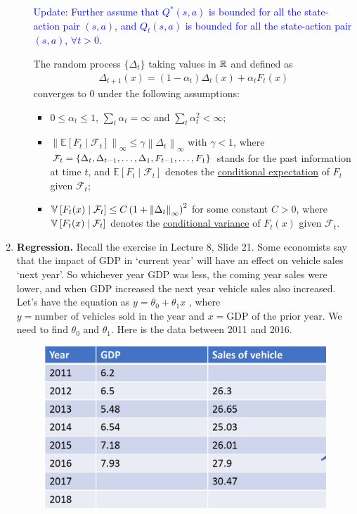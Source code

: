 \documentclass{article}
\newcommand{\mytextcolor}[1]{\textcolor{blue}{{}#1}}
\begin{document}
\begin{enumerate}
\begin{enumerate}
    \mytextcolor{Update: Further assume that $Q^\ast(s,a)$ is bounded for all the state-action pair $(s,a)$, and $Q_t(s,a)$ is bounded for all the state-action pair $(s,a)$, $\forall t>0$.}
    \begin{lemma}
        The random process $\{\Delta_t\}$ taking values in ${\mathbb{R}}$ and defined as
        \begin{align*}
            \Delta_{t+1}(x)=\left(1-\alpha_{t}\right) \Delta_{t}(x)+\alpha_{t} F_{t}(x)
        \end{align*}
        converges to $0$ under the following assumptions:
        \begin{itemize}
            \item $0\leq\alpha_{t}\leq1$, $\sum_{t} \alpha_{t}=\infty$ and $\sum_{t} \alpha^2_{t}<\infty$;
            \item $\left\|\mathbb{E}\left[F_{t} \mid \mathcal{F}_{t}\right]\right\|_{\infty} \leq \gamma\left\|\Delta_{t}\right\|_{\infty}$ with $\gamma<1$, where ${\mathcal{F}}_t=\{\Delta_t,\Delta_{t-1},\ldots,\Delta_1,F_{t-1},\ldots,F_1\}$ stands for the past information at time $t$, and $\mathbb{E}\left[F_{t} \mid \mathcal{F}_{t}\right]$ denotes the \href{https://en.wikipedia.org/wiki/Conditional_expectation}{conditional expectation} of $F_{t}$ given $\mathcal{F}_{t}$;
            \item ${\mathbb{V}}\left[F_{t}(x) \mid \mathcal{F}_{t}\right] \leq C\left(1+\left\|\Delta_{t}\right\|_{\infty}\right)^2$ for some constant $C>0$, where ${\mathbb{V}}\left[F_{t}(x) \mid \mathcal{F}_{t}\right]$ denotes the \href{https://en.wikipedia.org/wiki/Conditional_variance}{conditional variance} of $F_{t}(x)$ given $\mathcal{F}_{t}$.
        \end{itemize}
    \end{lemma}
\end{enumerate}
\item \textbf{Regression.}
Recall the exercise in Lecture 8, Slide 21. Some economists say that the impact of GDP in `current year' will have an effect on vehicle sales `next year'. So whichever year GDP was less, the coming year sales were lower, and when GDP increased the next year vehicle sales also increased. Let's have the equation as 
$y=\theta_0+\theta_1 x$
, where $y = \text{number of vehicles sold in the year}$ and $x = \text{GDP of the prior year}$. We need to find $\theta_0$ and $\theta_1$. Here is the data between 2011 and 2016.
    	\begin{figure}[!htp]
    	    \centering
    	    \includegraphics[width=12cm]{figs/fig2.png}

\end{figure}
\end{enumerate}
\end{document}
